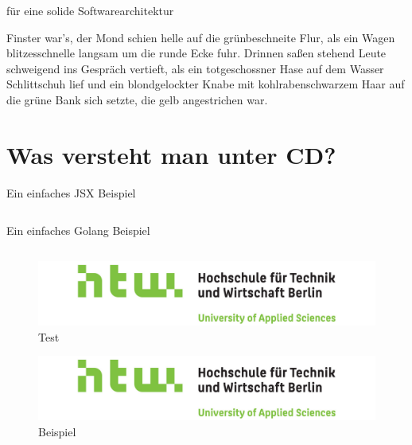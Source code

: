 für eine solide Softwarearchitektur

Finster war's, der Mond schien helle auf die grünbeschneite Flur, als
ein Wagen blitzesschnelle langsam um die runde Ecke fuhr. Drinnen
saßen stehend Leute schweigend ins Gespräch vertieft, als ein
totgeschossner Hase auf dem Wasser Schlittschuh lief und ein
blondgelockter Knabe mit kohlrabenschwarzem Haar auf die grüne Bank
sich setzte, die gelb angestrichen war.

\section{Was versteht man unter CD?}
\label{sec:was-versteht-man-unter-cd}


\begin{listing}
    \label{lst:HelloJSX}
    \caption{Ein einfaches JSX Beispiel}
    \inputminted{jsx}{snippets/examples/Welcome.jsx}
\end{listing}

\begin{listing}
    \label{lst:Golang}
    \caption{Ein einfaches Golang Beispiel}
    \inputminted{go}{snippets/examples/hello.go}
\end{listing}

\newpage

\begin{figure}
    \label{figure:test}
    \includegraphics[scale=0.2]{img/HTW}
    \caption{Test}
\end{figure}

\begin{figure}
    \label{figure:beispiel}
    \includegraphics[scale=0.2]{img/HTW}
    \caption{Beispiel}
\end{figure}

